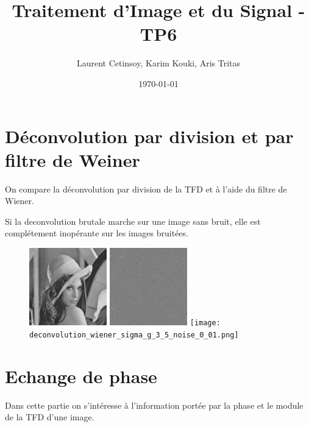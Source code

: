 \documentclass{article}
\title{Traitement d'Image et du Signal - TP6}
\author{Laurent Cetinsoy, Karim Kouki, Aris Tritas }
\date{\today}
\begin{document}
\maketitle


\section{Déconvolution par division et par filtre de Weiner}

On compare la déconvolution par division de la TFD et à l'aide du filtre de Wiener.


Si la deconvolution brutale marche sur une image sans bruit, elle est complétement inopérante sur les images bruitées. 


\begin{figure}[h]
	\includegraphics[width=0.3\textwidth]{deconvolution_sigma_1.png}
	\includegraphics[width=0.3\textwidth]{deconvolution_sigma_1_noise_0_01.png}
	\texttt{[image: deconvolution\_wiener\_sigma\_g\_3\_5\_noise\_0\_01.png]}

  \caption{}
\end{figure}


\section{Echange de phase}

Dans cette partie on s'intéresse à l'information portée par la phase et le module de la TFD d'une image. 
\end{document}

